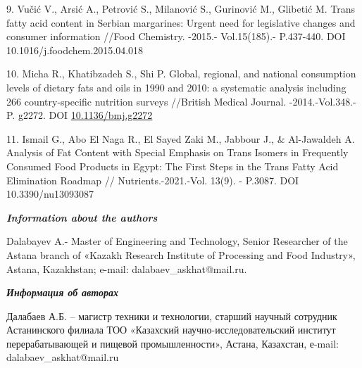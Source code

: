 \begin{references}
9. Vučić V., Arsić A., Petrović S., Milanović S., Gurinović M., Glibetić
M. Trans fatty acid content in Serbian margarines: Urgent need for
legislative changes and consumer information //Food Chemistry. -2015.-
Vol.15(185).- P.437-440. DOI 10.1016/j.foodchem.2015.04.018

10. Micha R., Khatibzadeh S., Shi P. Global, regional, and national
consumption levels of dietary fats and oils in 1990 and 2010: a
systematic analysis including 266 country-specific nutrition surveys
//British Medical Journal. -2014.-Vol.348.-P. g2272. DOI
\href{https://doi.org/10.1136/bmj.g2272}{10.1136/bmj.g2272}

11. Ismail G., Abo El Naga R., El Sayed Zaki M., Jabbour J., \&
Al-Jawaldeh A. Analysis of Fat Content with Special Emphasis on Trans
Isomers in Frequently Consumed Food Products in Egypt: The First Steps
in the Trans Fatty Acid Elimination Roadmap // Nutrients.-2021.-Vol.
13(9). - P.3087. DOI 10.3390/nu13093087
\end{references}

\begin{authorinfo}
\emph{{\bfseries Information about the authors}}

Dalabayev A.- Master of Engineering and Technology, Senior Researcher of
the Astana branch of «Kazakh Research Institute of Processing and Food
Industry», Astana, Kazakhstan; e-mail: dalabaev\_askhat@mail.ru.

\emph{{\bfseries Информация об авторах}}

Далабаев А.Б. -- магистр техники и технологии, старший научный сотрудник
Астанинского филиала ТОО «Казахский научно-исследовательский институт
перерабатывающей и пищевой промышленности», Астана, Казахстан, е-mail:\\
dalabaev\_askhat@mail.ru
\end{authorinfo}
